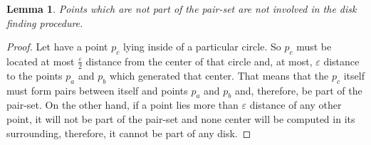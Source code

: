 \documentclass[twocolumn]{IEEEtran}
\newtheorem{lemma}{Lemma}
\begin{document}
\begin{lemma}\label{lemma:points}
Points which are not part of the pair-set are not involved in the disk finding procedure.
\end{lemma}

\begin{proof}
  Let have a point $p_c$ lying inside of a particular circle. So $p_c$ must be located at most $\frac{\varepsilon}{2}$ distance from the center of that circle and, at most, $\varepsilon$ distance to the points $p_a$ and $p_b$ which generated that center.  That means that the $p_c$ itself must form pairs between itself and points $p_a$ and $p_b$ and, therefore, be part of the pair-set.  On the other hand, if a point lies more than $\varepsilon$ distance of any other point, it will not be part of the pair-set and none center will be computed in its surrounding, therefore, it cannot be part of any disk. 
\end{proof}
\end{document}
